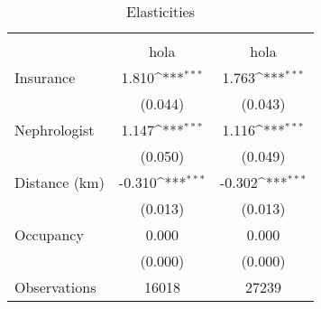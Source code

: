 \begin{table}[htbp]\centering
\def\sym#1{\ifmmode^{#1}\else\(^{#1}\)\fi}
\caption{Elasticities}
\begin{tabular}{l*{2}{c}}
\toprule
                    &\multicolumn{1}{c}{} &\multicolumn{1}{c}{} \\
                    &        hola         &        hola         \\
\midrule
Insurance           &       1.810\sym{***}&       1.763\sym{***}\\
                    &     (0.044)         &     (0.043)         \\
Nephrologist        &       1.147\sym{***}&       1.116\sym{***}\\
                    &     (0.050)         &     (0.049)         \\
Distance (km)       &      -0.310\sym{***}&      -0.302\sym{***}\\
                    &     (0.013)         &     (0.013)         \\
Occupancy           &       0.000         &       0.000         \\
                    &     (0.000)         &     (0.000)         \\
\midrule
Observations        &       16018         &       27239         \\
\bottomrule
\end{tabular}
\end{table}
